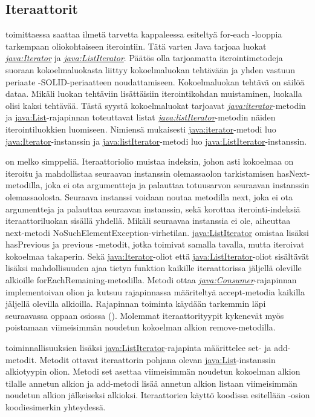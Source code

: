 \documentclass[a4paper,justified,notoc]{tufte-book}
\newcommand{\java}[1]{\underline{\gls{java:#1}}}
\newcommand{\newjava}[1]{\textit{\java{#1}}}
\begin{document}
\begin{fullwidth}
\subsection{Iteraattorit}
\label{iterators}

 toimittaessa saattaa ilmetä tarvetta kappaleessa 
esiteltyä for-each -looppia tarkempaan oliokohtaiseen iterointiin. Tätä varten Java tarjoaa luokat
\newjava{Iterator} ja \newjava{ListIterator}. Päätös olla tarjoamatta iterointimetodeja suoraan
kokoelmaluokasta liittyy kokoelmaluokan tehtävään ja \gls{yhden vastuun periaate}
-SOLID-periaatteen noudattamiseen. Kokoelmaluokan tehtävä on säilöä dataa. Mikäli luokan
tehtäviin lisättäisiin iterointikohdan muistaminen, luokalla olisi kaksi tehtävää. Tästä syystä
kokoelmaluokat tarjoavat \newjava{iterator}-metodin ja \java{List}-rajapinnan toteuttavat listat
\newjava{listIterator}-metodin näiden iterointiluokkien luomiseen. Nimiensä mukaisesti
\java{iterator}-metodi luo \java{Iterator}-instanssin ja \java{listIterator}-metodi luo
\java{ListIterator}-instanssin.

 on melko simppeliä. Iteraattoriolio muistaa indeksin, johon
asti kokoelmaa on iteroitu ja mahdollistaa seuraavan instanssin olemassaolon tarkistamisen
hasNext-metodilla, joka ei ota argumentteja ja palauttaa totuusarvon seuraavan instanssin
olemassaolosta. Seuraava instanssi voidaan noutaa metodilla next, joka ei ota argumentteja ja
palauttaa seuraavan instanssin, sekä korottaa iterointi-indeksiä iteraattoriluokan sisällä
yhdellä. Mikäli seuraavaa instanssia ei ole, aiheuttaa next-metodi
NoSuchElementException-virhetilan. \java{ListIterator} omistaa lisäksi hasPrevious ja previous
-metodit, jotka toimivat samalla tavalla, mutta iteroivat kokoelmaa takaperin. Sekä
\java{Iterator}-oliot että \java{ListIterator}-oliot sisältävät lisäksi mahdollisuuden ajaa
tietyn funktion kaikille iteraattorissa jäljellä oleville alkioille forEachRemaining-metodilla.
Metodi ottaa \newjava{Consumer}-rajapinnan implementoivan olion ja kutsuu rajapinnassa
määriteltyä accept-metodia kaikilla jäljellä olevilla alkioilla. Rajapinnan toiminta käydään
tarkemmin läpi seuraavassa oppaan osiossa (). Molemmat iteraattorityypit
kykenevät myös poistamaan viimeisimmän noudetun kokoelman alkion remove-metodilla.

 toiminnallisuuksien lisäksi \java{ListIterator}-rajapinta
määrittelee set- ja add-metodit. Metodit ottavat iteraattorin pohjana olevan 
\java{List}-instanssin alkiotyypin olion. Metodi set asettaa viimeisimmän noudetun kokoelman
alkion tilalle annetun alkion ja add-metodi lisää annetun alkion listaan viimeisimmän noudetun
alkion jälkeiseksi alkioksi. Iteraattorien käyttö koodissa esitellään -osion
koodiesimerkin yhteydessä.


\end{fullwidth}
\end{document}
